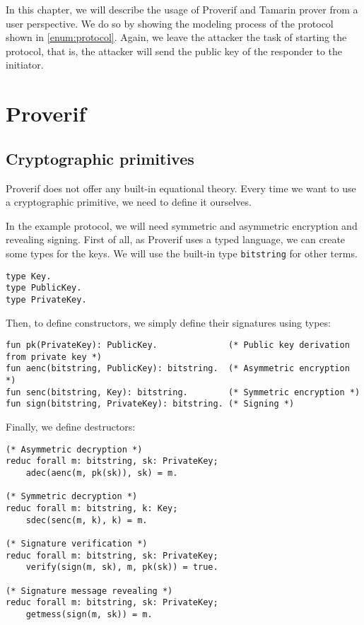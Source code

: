 
\label{sec:simple_protocol}
In this chapter, we will describe the usage of Proverif and Tamarin prover from a user perspective. We do so by showing the modeling process of the protocol shown in \cref{enum:protocol}. Again, we leave the attacker the task of starting the protocol, that is, the attacker will send the public key of the responder to the initiator.


\lstset{language=proverif}
\section{Proverif}

\subsection{Cryptographic primitives}
Proverif does not offer any built-in equational theory. Every time we want to use a cryptographic primitive, we need to define it ourselves.

In the example protocol, we will need symmetric and asymmetric encryption and revealing signing. First of all, as Proverif uses a typed language, we can create some types for the keys. We will use the built-in type \lstinline{bitstring} for other terms.

\begin{lstlisting}
type Key.
type PublicKey.
type PrivateKey.
\end{lstlisting}

Then, to define constructors, we simply define their signatures using types:

\begin{lstlisting}
fun pk(PrivateKey): PublicKey.              (* Public key derivation from private key *)
fun aenc(bitstring, PublicKey): bitstring.  (* Asymmetric encryption *)
fun senc(bitstring, Key): bitstring.        (* Symmetric encryption *)
fun sign(bitstring, PrivateKey): bitstring. (* Signing *)
\end{lstlisting}

Finally, we define destructors:
\begin{lstlisting}
(* Asymmetric decryption *)
reduc forall m: bitstring, sk: PrivateKey;
    adec(aenc(m, pk(sk)), sk) = m.
  
(* Symmetric decryption *)
reduc forall m: bitstring, k: Key;
    sdec(senc(m, k), k) = m.

(* Signature verification *)
reduc forall m: bitstring, sk: PrivateKey;
    verify(sign(m, sk), m, pk(sk)) = true.

(* Signature message revealing *)
reduc forall m: bitstring, sk: PrivateKey;
    getmess(sign(m, sk)) = m.
\end{lstlisting}

